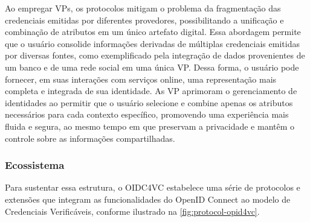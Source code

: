 Ao empregar \acs{VP}s, os protocolos mitigam o problema da fragmentação das credenciais emitidas por diferentes provedores, possibilitando a unificação e combinação de atributos em um único artefato digital. Essa abordagem permite que o usuário consolide informações derivadas de múltiplas credenciais emitidas por diversas fontes, como exemplificado pela integração de dados provenientes de um banco e de uma rede social em uma única \acs{VP}. Dessa forma, o usuário pode fornecer, em suas interações com serviços online, uma representação mais completa e integrada de sua identidade. As \acs{VP} aprimoram o gerenciamento de identidades ao permitir que o usuário selecione e combine apenas os atributos necessários para cada contexto específico, promovendo uma experiência mais fluida e segura, ao mesmo tempo em que preservam a privacidade e mantêm o controle sobre as informações compartilhadas.

\subsubsection{Ecossistema}\label{subsubsection:ecossistema-oidc4vc}

Para sustentar essa estrutura, o \acs{OIDC4VC} estabelece uma série de protocolos e extensões que integram as funcionalidades do OpenID Connect ao modelo de Credenciais Verificáveis, conforme ilustrado na  \autoref{fig:protocol-opid4vc}.




